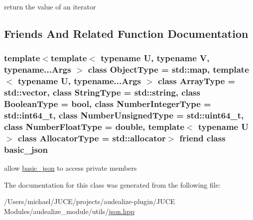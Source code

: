 return the value of an iterator 



\subsection{Friends And Related Function Documentation}
\subsubsection[{\texorpdfstring{basic\+\_\+json}{basic_json}}]{\setlength{\rightskip}{0pt plus 5cm}template$<$template$<$ typename U, typename V, typename...\+Args $>$ class Object\+Type = std\+::map, template$<$ typename U, typename...\+Args $>$ class Array\+Type = std\+::vector, class String\+Type  = std\+::string, class Boolean\+Type  = bool, class Number\+Integer\+Type  = std\+::int64\+\_\+t, class Number\+Unsigned\+Type  = std\+::uint64\+\_\+t, class Number\+Float\+Type  = double, template$<$ typename U $>$ class Allocator\+Type = std\+::allocator$>$ friend class {\bf basic\+\_\+json}\hspace{0.3cm}{\ttfamily [friend]}}\hypertarget{classnlohmann_1_1basic__json_1_1const__iterator_ada3100cdb8700566051828f1355fa745}{}\label{classnlohmann_1_1basic__json_1_1const__iterator_ada3100cdb8700566051828f1355fa745}


allow \hyperlink{classnlohmann_1_1basic__json}{basic\+\_\+json} to access private members 



The documentation for this class was generated from the following file\+:\begin{DoxyCompactItemize}
\item 
/\+Users/michael/\+J\+U\+C\+E/projects/audealize-\/plugin/\+J\+U\+C\+E Modules/audealize\+\_\+module/utils/\hyperlink{json_8hpp}{json.\+hpp}\end{DoxyCompactItemize}
